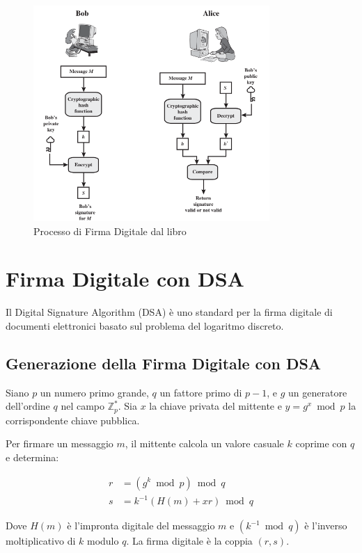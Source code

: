 \documentclass[a4paper,12pt]{report}
\begin{document}
\begin{figure}[ht]
    \centering
    \includegraphics[width=0.8\textwidth]{img/digital_signature_process.png}
    \caption{Processo di Firma Digitale dal libro \cite{stallings2011cryptography}}
    \label{fig:digital_signature_process}
\end{figure}

\section{Firma Digitale con DSA}
Il Digital Signature Algorithm (DSA) è uno standard per la firma digitale di documenti elettronici basato sul problema del logaritmo discreto.

\subsection{Generazione della Firma Digitale con DSA}
Siano $p$ un numero primo grande, $q$ un fattore primo di $p - 1$, e $g$ un generatore dell'ordine $q$ nel campo $\mathbb{Z}_p^*$. Sia $x$ la chiave privata del mittente e $y = g^x \bmod p$ la corrispondente chiave pubblica.

Per firmare un messaggio $m$, il mittente calcola un valore casuale $k$ coprime con $q$ e determina:

\begin{align*}
r &= (g^k \bmod p) \bmod q \\
s &= k^{-1}(H(m) + xr) \bmod q
\end{align*}

Dove $H(m)$ è l'impronta digitale del messaggio $m$ e $(k^{-1} \bmod q)$ è l'inverso moltiplicativo di $k$ modulo $q$. La firma digitale è la coppia $(r, s)$.
\end{document}
